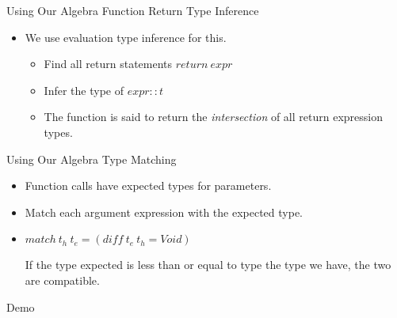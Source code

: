 \documentclass[12pt,t]{beamer}
\newcommand{\bi}{\begin{itemize}}
\newcommand{\ei}{\end{itemize}}
\newcommand{\subt}[1]{{\footnotesize \color{subtitle} {#1}}}
\newcommand{\vitem}{\vfill\item}
\begin{document}
\begin{frame}{Using Our Algebra}
    \subt{Function Return Type Inference}

    \bi
        \vitem We use evaluation type inference for this.
        \bi
            \vitem Find all return statements $return\ expr$
            \vitem Infer the type of $expr :: t$
            \vitem The function is said to return the \emph{intersection}
                of all return expression types.
        \ei
    \ei
\end{frame}

\begin{frame}{Using Our Algebra}
    \subt{Type Matching}

    \bi
        \vitem Function calls have expected types for parameters.
        \vitem Match each argument expression with the expected type.
        \vitem $match\ t_h\ t_e = (diff\ t_e\ t_h = Void)$

        If the type expected is less than or equal to type the type we have,
        the two are compatible.
    \ei
\end{frame}

\begin{frame}
    \vfill
    \centering\large Demo
\end{frame}
\end{document}

